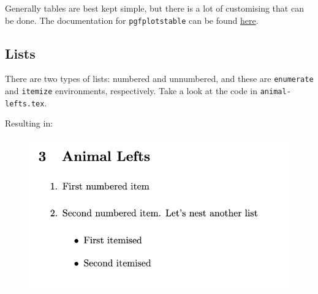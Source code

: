 Generally tables are best kept simple, but there is a lot of customising that can be done.
The documentation for \texttt{pgfplotstable} can be found \href{https://anorien.csc.warwick.ac.uk/mirrors/CTAN/graphics/pgf/contrib/pgfplots/doc/pgfplotstable.pdf}{here}.

\subsection{Lists}
There are two types of lists: numbered and unnumbered, and these are \verb|enumerate| and \verb|itemize| environments, respectively.
Take a look at the code in \verb|animal-lefts.tex|.



Resulting in:

\begin{figure}[h]
    \centering
        \includegraphics[scale=0.8]{figures/list.png}
    \label{fig:list}
\end{figure}

